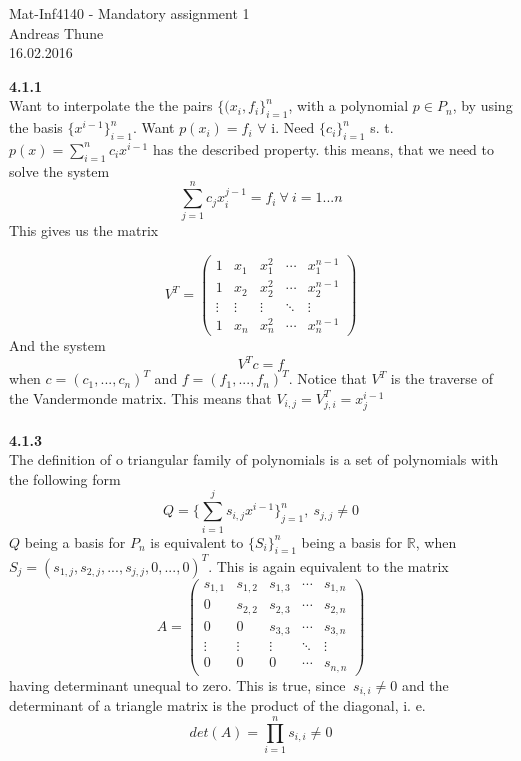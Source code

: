 \documentclass[11pt,a4paper]{report}
\begin{document}
\begin{center}

\LARGE Mat-Inf4140 - Mandatory assignment 1
\\
Andreas Thune
\\
\LARGE
16.02.2016

\end{center}
\textbf{4.1.1}
\\
Want to interpolate the the pairs $\{(x_i,f_i \}_{i=1}^n$, with a polynomial $p \in P_n$, by using the basis $\{ x^{i-1}\}_{i=1}^n$. Want $p(x_i)=f_i$ $\forall$ i. Need $\{ c_i\}_{i=1}^n$ s. t. $p(x) = \sum_{i=1}^n c_ix^{i-1} $ has the described property. this means, that we need to solve the system $$\sum_{j=1}^n c_jx_i^{j-1} = f_i \ \forall \ i=1...n $$ This gives us the matrix

$$ 
V^T = 
 \begin{pmatrix}
  1 & x_1 & x_1^2 & \cdots & x_1^{n-1} \\
  1 & x_2 & x_2^2 &\cdots & x_2^{n-1} \\
  \vdots  & \vdots &\vdots  & \ddots & \vdots  \\
  1 & x_n & x_n^2 &\cdots & x_n^{n-1} 
 \end{pmatrix}
$$
And the system $$V^Tc=f$$ when $c=(c_1,...,c_n)^T$ and $f=(f_1,...,f_n)^T$. Notice that $V^T$ is the traverse of the Vandermonde matrix. This means that $V_{i,j} = V_{j,i}^T = x_j^{i-1}$
\\
\\
\textbf{4.1.3}
\\
The definition of o triangular family of polynomials is a set of polynomials with the following form $$Q=\{ \sum_{i=1}^js_{i,j}x^{i-1}\}_{j=1}^n, \ s_{j,j} \neq 0$$ $Q$ being a basis for $P_n$ is equivalent to $\{S_i\}_{i=1}^n$ being a basis for $\mathbb{R}$, when $S_j = (s_{1,j},s_{2,j},...,s_{j,j},0,...,0)^T$. This is again equivalent to the matrix $$ 
A = 
 \begin{pmatrix}
  s_{1,1} & s_{1,2} & s_{1,3} & \cdots & s_{1,n} \\
  0 & s_{2,2} & s_{2,3} &\cdots & s_{2,n} \\
  0 & 0 & s_{3,3} &\cdots & s_{3,n} \\
  \vdots  & \vdots &\vdots  & \ddots & \vdots  \\
  0 & 0 & 0 &\cdots & s_{n,n} 
 \end{pmatrix}
$$ having determinant unequal to zero. This is true, since $\ s_{i,i}\neq 0$ and the determinant of a triangle matrix is the product of the diagonal, i. e. $$det(A)=\prod_{i=1}^n s_{i,i}\neq 0$$ 
\end{document}
